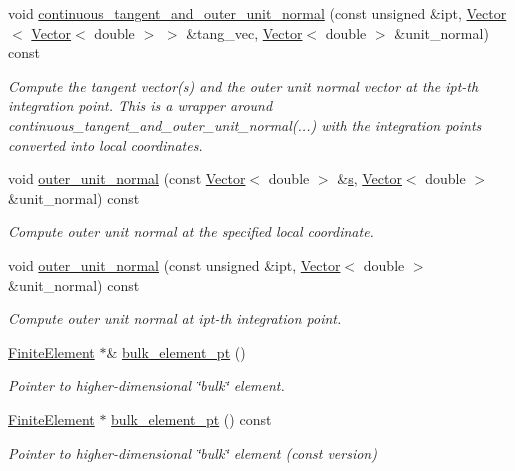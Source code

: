 \begin{DoxyCompactItemize}
void \hyperlink{classoomph_1_1FaceElement_a2114d937858d142142ea4f4e2342e7b9}{continuous\+\_\+tangent\+\_\+and\+\_\+outer\+\_\+unit\+\_\+normal} (const unsigned \&ipt, \hyperlink{classoomph_1_1Vector}{Vector}$<$ \hyperlink{classoomph_1_1Vector}{Vector}$<$ double $>$ $>$ \&tang\+\_\+vec, \hyperlink{classoomph_1_1Vector}{Vector}$<$ double $>$ \&unit\+\_\+normal) const
\begin{DoxyCompactList}\small\item\em Compute the tangent vector(s) and the outer unit normal vector at the ipt-\/th integration point. This is a wrapper around continuous\+\_\+tangent\+\_\+and\+\_\+outer\+\_\+unit\+\_\+normal(...) with the integration points converted into local coordinates. \end{DoxyCompactList}\item 
void \hyperlink{classoomph_1_1FaceElement_a49cf44d89e80926635d2a26abfbbf3b0}{outer\+\_\+unit\+\_\+normal} (const \hyperlink{classoomph_1_1Vector}{Vector}$<$ double $>$ \&\hyperlink{cfortran_8h_ab7123126e4885ef647dd9c6e3807a21c}{s}, \hyperlink{classoomph_1_1Vector}{Vector}$<$ double $>$ \&unit\+\_\+normal) const
\begin{DoxyCompactList}\small\item\em Compute outer unit normal at the specified local coordinate. \end{DoxyCompactList}\item 
void \hyperlink{classoomph_1_1FaceElement_ada4480c304100898d0c45be6d3ce181f}{outer\+\_\+unit\+\_\+normal} (const unsigned \&ipt, \hyperlink{classoomph_1_1Vector}{Vector}$<$ double $>$ \&unit\+\_\+normal) const
\begin{DoxyCompactList}\small\item\em Compute outer unit normal at ipt-\/th integration point. \end{DoxyCompactList}\item 
\hyperlink{classoomph_1_1FiniteElement}{Finite\+Element} $\ast$\& \hyperlink{classoomph_1_1FaceElement_a7539054d858d73989d7c1166e333e0f8}{bulk\+\_\+element\+\_\+pt} ()
\begin{DoxyCompactList}\small\item\em Pointer to higher-\/dimensional \char`\"{}bulk\char`\"{} element. \end{DoxyCompactList}\item 
\hyperlink{classoomph_1_1FiniteElement}{Finite\+Element} $\ast$ \hyperlink{classoomph_1_1FaceElement_a8d2cf880d94b4b23ca2a25a6afaf7146}{bulk\+\_\+element\+\_\+pt} () const
\begin{DoxyCompactList}\small\item\em Pointer to higher-\/dimensional \char`\"{}bulk\char`\"{} element (const version) \end{DoxyCompactList}\item 

\end{DoxyCompactItemize}
